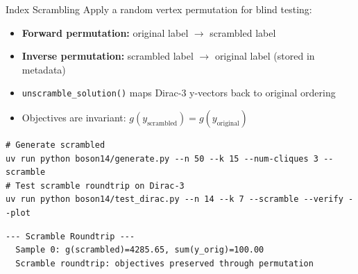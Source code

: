 \documentclass[aspectratio=169]{beamer}
\begin{document}
\begin{frame}[fragile]{Index Scrambling}
    Apply a random vertex permutation for blind testing:

    \begin{itemize}
        \item \textbf{Forward permutation:} original label $\to$ scrambled label
        \item \textbf{Inverse permutation:} scrambled label $\to$ original label (stored in metadata)
        \item \texttt{unscramble\_solution()} maps Dirac-3 y-vectors back to original ordering
        \item Objectives are invariant: $g(y_{\text{scrambled}}) = g(y_{\text{original}})$
    \end{itemize}

    \vspace{0.5em}
\begin{lstlisting}[style=shell,numbers=none]
# Generate scrambled
uv run python boson14/generate.py --n 50 --k 15 --num-cliques 3 --scramble
# Test scramble roundtrip on Dirac-3
uv run python boson14/test_dirac.py --n 14 --k 7 --scramble --verify --plot
\end{lstlisting}

\begin{lstlisting}[numbers=none,basicstyle=\ttfamily\scriptsize]
--- Scramble Roundtrip ---
  Sample 0: g(scrambled)=4285.65, sum(y_orig)=100.00
  Scramble roundtrip: objectives preserved through permutation
\end{lstlisting}
\end{frame}

\end{document}
